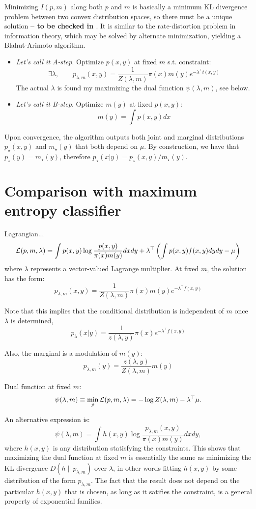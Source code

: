 \documentclass[english]{scrartcl}
\begin{document}
Minimizing $I(p,m)$ along both $p$ and $m$ is basically a minimum KL
divergence problem between two convex distribution spaces, so there
must be a unique solution {\bf -- to be checked in
  \cite{Cover-91}}. It is similar to the rate-distortion problem in
information theory, which may be solved by alternate minimization,
yielding a Blahut-Arimoto algorithm.
\begin{itemize}
\item {\em Let's call it A-step}. Optimize $p(x,y)$ at fixed $m$
  s.t. constraint:
$$
\exists \lambda, \qquad
p_{\lambda,m}(x,y) = \frac{1}{Z(\lambda, m)} \pi(x) m(y) e^{-\lambda^\top t(x,y)}
$$
The actual $\lambda$ is found my maximizing the dual function
$\psi(\lambda,m)$, see below.
\item {\em Let's call it B-step}. Optimize $m(y)$ at fixed $p(x,y)$:
$$
m(y) = \int p(x,y) dx
$$
\end{itemize}

Upon convergence, the algorithm outputs both joint and marginal
distributions $p_{\star}(x,y)$ and $m_{\star}(y)$ that both depend on
$\mu$. By construction, we have that $p_{\star}(y) = m_{\star}(y)$,
therefore $p_\star(x|y)=p_{\star}(x,y)/m_{\star}(y)$.


\section{Comparison with maximum entropy classifier}

Lagrangian...
$$
{\cal L}(p,m,\lambda)
= 
\int p(x,y) \log \frac{p(x,y)}{\pi(x)m(y)} dxdy
+
\lambda^\top \left( 
\int p(x,y) f(x,y) dydy - \mu 
\right)
$$ where $\lambda$ represents a vector-valued Lagrange multiplier. At
fixed $m$, the solution has the form:
$$
p_{\lambda,m}(x,y) = \frac{1}{Z(\lambda,m)}
\pi(x) m(y) e^{-\lambda^\top f(x,y)} 
$$

Note that this implies that the conditional distribution is
independent of $m$ once $\lambda$ is determined,
$$
p_\lambda(x|y) = \frac{1}{z(\lambda,y)} \pi(x) e^{-\lambda^\top f(x,y)} 
$$

Also, the marginal is a modulation of $m(y)$:
$$
p_{\lambda,m}(y) = \frac{z(\lambda,y)}{Z(\lambda,m)} m(y)
$$

Dual function at fixed $m$:
$$
\psi(\lambda,m) 
\equiv \min_p {\cal L}(p,m,\lambda)
= 
- \log Z(\lambda,m) - \lambda^\top \mu
.
$$ 

An alternative expression is:
$$
\psi(\lambda, m)
= 
\int h(x,y) 
\log \frac{p_{\lambda,m}(x,y)}{\pi(x)m(y)} dxdy,
$$ where $h(x,y)$ is any distribution statisfying the
constraints. This shows that maximizing the dual function at fixed $m$
is essentially the same as minimizing the KL divergence
$D(h\|p_{\lambda,m})$ over $\lambda$, in other words fitting $h(x,y)$
by some distribution of the form $p_{\lambda,m}$. The fact that the
result does not depend on the particular $h(x,y)$ that is chosen, as
long as it satifies the constraint, is a general property of
exponential families.
\end{document}
